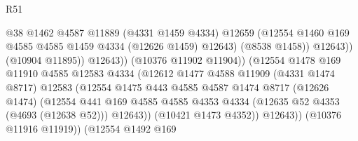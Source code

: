 \begin{lexlean}{R51}
\begin{coremodule}
                                            @38
                                            @1462
                                            @4587
                                            @11889
                                            (@4331 @1459 @4334)
                                            @12659
                                            (@12554
                                              @1460
                                              @169
                                              @4585
                                              @4585
                                              @1459
                                              @4334
                                              (@12626 @1459)
                                              @12643)
                                            (@8538 @1458))
                                          @12643))
                                      (@10904 @11895))
                                    @12643))
                                (@10376 @11902 @11904))
                              (@12554
                                @1478
                                @169
                                @11910
                                @4585
                                @12583
                                @4334
                                (@12612
                                  @1477
                                  @4588
                                  @11909
                                  (@4331 @1474 @8717)
                                  @12583
                                  (@12554
                                    @1475
                                    @443
                                    @4585
                                    @4587
                                    @1474
                                    @8717
                                    (@12626 @1474)
                                    (@12554
                                      @441
                                      @169
                                      @4585
                                      @4585
                                      @4353
                                      @4334
                                      (@12635 @52 @4353 (@4693 (@12638 @52)))
                                      @12643))
                                  (@10421 @1473 @4352))
                                @12643))
                            (@10376 @11916 @11919))
                          (@12554
                            @1492
                            @169

\end{coremodule}
\end{lexlean}

